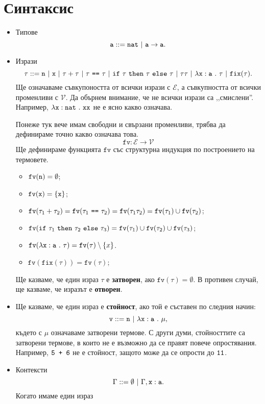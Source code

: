 \section{Синтаксис}

\newcommand{\rename}[2]{\{\vv{#1}/\vv{#2}\}}

\newcommand{\fix}{\texttt{fix}}
\newcommand{\fv}{\texttt{fv}}

\begin{itemize}
\item
  Типове
  \[\vv{a} ::= \vv{nat}\ |\ \vv{a} \to \vv{a}.\]
\item
  Изрази
  \[\tau ::= \vv{n}\ |\ \vv{x}\ |\ \tau + \tau\ |\ \tau\ \vv{==}\ \tau\ |\ \ifelse{\tau}{\tau}{\tau}\ |\ \tau\tau\ |\ \lamb{x}{a}{\tau}\ |\ \fix(\tau).\]
  Ще означаваме съвкупоността от всички изрази с $\mathcal{E}$, а съвкупността от всички променливи с $\mathcal{V}$.
  Да обърнем внимание, че не всички изрази са ,,смислени''. Например,
  $\lambda\texttt{x}:\texttt{nat}\ .\ {\texttt{xx}}$ не е ясно какво означава.
  
  Понеже тук вече имам свободни и свързани променливи, трябва да дефинираме точно какво означава това.
  \[\fv:\mathcal{E} \to \mathcal{V}\]
  Ще дефинираме функцията $\texttt{fv}$ със структурна индукция по построението на термовете.
  
  \begin{itemize}
  \item
    $\fv(\vv{n}) = \emptyset$;
  \item
    $\fv(\vv{x}) = \{\vv{x}\}$;
  \item
    $\fv(\tau_1 + \tau_2) = \fv(\tau_1\ \vv{==}\ \tau_2) = \fv(\tau_1\tau_2) = \fv(\tau_1) \cup \fv(\tau_2)$;
  \item
    $\fv(\ifelse{\tau_1}{\tau_2}{\tau_3}) = \fv(\tau_1) \cup \fv(\tau_2) \cup \fv(\tau_3)$;
  \item
    $\fv(\lamb{x}{a}{\tau}) = \fv(\tau) \setminus \{x\}$.
  \item
    $\fv(\fix(\tau)) = \fv(\tau)$;
  \end{itemize}
  
  Ще казваме, че един израз $\tau$ е {\bf затворен}, ако $\fv(\tau) = \emptyset$.
  В противен случай, ще казваме, че изразът е {\bf отворен}.
\item
  Ще казваме, че един израз е {\bf стойност}, ако той е съставен по следния начин:
  \[\vv{v} ::= \vv{n}\ |\ \lamb{x}{a}{\mu},\]
  където с $\mu$ означаваме затворени термове.
  С други думи, стойносттите са затворени термове, в които не е възможно да се правят повече опростявания.
  Например, $\texttt{5 + 6}$ не е стойност, защото може да се опрости до $\texttt{11}$.
\item
  Контексти
  \[\Gamma ::= \emptyset\ |\ \Gamma,\type{x}{a}.\]
  Когато имаме един израз 
\end{itemize}

